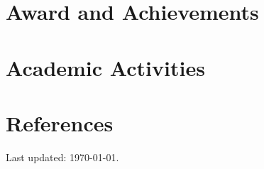 \documentclass[letter,10pt]{article}
\begin{document}
\section{Award and Achievements}


\section{Academic Activities}



\section{References}





\vspace*{\fill}

\begin{flushleft}
    Last updated: \today.
\end{flushleft}
\end{document}

